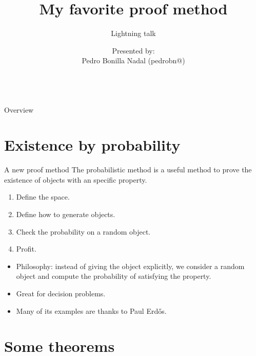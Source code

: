 \documentclass{beamer}
\title[Short title]{My favorite proof method}
\subtitle{Lightning talk}
\author{Presented by: \\Pedro Bonilla Nadal (pedrobn@)\\[0.25cm]\\\medskip} %
\institute[Universidad de Granada]{
\\ %
\medskip
}
\begin{document}
                     
\begin{frame}

  \titlepage %

\end{frame}

\begin{frame}{Overview}
\tableofcontents
\end{frame}



\section{Existence by probability}
\begin{frame}{A new proof method}
 The probabilistic method is a useful method to prove the existence of objects
 with an specific property.
  \begin{enumerate}
  \item Define the space.
  \item Define how to generate objects.
  \item Check the probability on a random object.
  \item Profit. 
  \end{enumerate}
\end{frame}

\begin{frame}
 \begin{itemize}
\item Philosophy: instead of giving the object explicitly, we consider a random object and compute the probability of satisfying the property. 
\item Great for decision problems.
\item Many of its examples are thanks to Paul Erd\H{o}s.
\end{itemize}
\end{frame}

\section{Some theorems}
\end{document}
